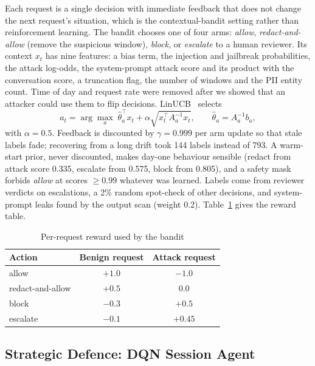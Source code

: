 \documentclass[conference]{IEEEtran}
\begin{document}
Each request is a single decision with immediate feedback that does not
change the next request's situation, which is the contextual-bandit
setting rather than reinforcement learning. The bandit chooses one of four
arms: \emph{allow}, \emph{redact-and-allow} (remove the suspicious window),
\emph{block}, or \emph{escalate} to a human reviewer. Its context $x_t$ has
nine features: a bias term, the injection and jailbreak probabilities, the
attack log-odds, the system-prompt attack score and its product with the
conversation score, a truncation flag, the number of windows and the PII
entity count. Time of day and request rate were removed after we showed
that an attacker could use them to flip decisions. LinUCB~\cite{li2010contextual}
selects
\begin{equation}
a_t=\arg\max_a\;\hat\theta_a^{\top}x_t+\alpha\sqrt{x_t^{\top}A_a^{-1}x_t},
\qquad \hat\theta_a=A_a^{-1}b_a ,
\end{equation}
with $\alpha=0.5$. Feedback is discounted by $\gamma=0.999$ per arm update
so that stale labels fade; recovering from a long drift took 144 labels
instead of 793. A warm-start prior, never discounted, makes day-one
behaviour sensible (redact from attack score 0.335, escalate from 0.575,
block from 0.805), and a safety mask forbids \emph{allow} at scores $\ge
0.99$ whatever was learned. Labels come from reviewer verdicts on
escalations, a 2\% random spot-check of other decisions, and system-prompt
leaks found by the output scan (weight 0.2). Table~\ref{tab:reward} gives
the reward table.

\begin{table}[t]
\caption{Per-request reward used by the bandit}
\label{tab:reward}
\centering
\footnotesize
\begin{tabular}{lcc}
\toprule
Action & Benign request & Attack request \\
\midrule
allow & $+1.0$ & $-1.0$ \\
redact-and-allow & $+0.5$ & $0.0$ \\
block & $-0.3$ & $+0.5$ \\
escalate & $-0.1$ & $+0.45$ \\
\bottomrule
\end{tabular}
\end{table}

\subsection{Strategic Defence: DQN Session Agent}
\end{document}

